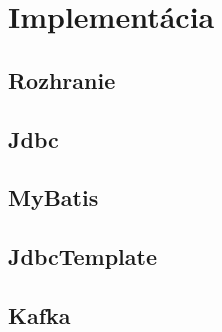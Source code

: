 
\chapter{Implementácia}

\section{Rozhranie}

\section{Jdbc}

\section{MyBatis}

\section{JdbcTemplate}

\section{Kafka}


